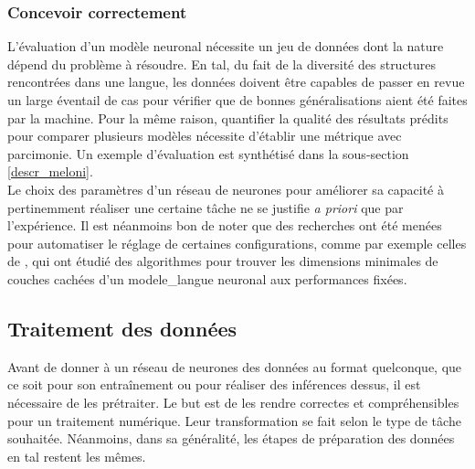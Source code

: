 \documentclass[12pt, twoside]{report}
\begin{document}
\subsubsection{Concevoir correctement}
L'évaluation d'un modèle neuronal nécessite un jeu de données dont la nature dépend du problème à résoudre. En \Gls{tal}, du fait de la diversité des structures rencontrées dans une langue, les données doivent être capables de passer en revue un large éventail de cas pour vérifier que de bonnes généralisations aient été faites par la machine. Pour la même raison, quantifier la qualité des résultats prédits pour comparer plusieurs modèles nécessite d'établir une métrique avec parcimonie. \autocite[p. 43]{fourrier} Un exemple d'évaluation est synthétisé dans la sous-section \ref{descr_meloni}. \\
Le choix des paramètres d'un réseau de neurones pour améliorer sa capacité à pertinemment réaliser une certaine tâche ne se justifie \textit{a priori} que par l'expérience. \autocite[p.40]{fourrier} Il est néanmoins bon de noter que des recherches ont été menées pour automatiser le réglage de certaines configurations, comme par exemple celles de \cite{auto_sizing_layer_dim}, qui ont étudié des algorithmes pour trouver les dimensions minimales de couches cachées d'un \gls{modele_langue} neuronal aux performances fixées.

\subsection{Traitement des données}

Avant de donner à un réseau de neurones des données au format quelconque, que ce soit pour son entraînement ou pour réaliser des inférences dessus, il est nécessaire de les prétraiter. Le but est de les rendre correctes et compréhensibles pour un traitement numérique. Leur transformation se fait selon le type de tâche souhaitée. Néanmoins, dans sa généralité, les étapes de préparation des données en \Gls{tal} restent les mêmes.\\
\end{document}
